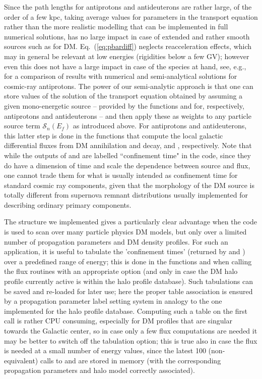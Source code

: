 Since the path lengths for antiprotons and antideuterons are rather large, of the order of a few kpc, taking average
values for parameters in the transport equation rather than the more realistic modelling that can be implemented
in full numerical solutions, has no large impact in case of extended and rather 
smooth sources such as for DM. 
Eq.~(\ref{eq:pbardiff}) neglects reacceleration effects, which may in general be relevant at low energies
(rigidities below a few GV); however even this does not have a large impact in case of the species at hand,
see, e.g.,~\cite{Evoli:2011id} for a comparison of results with numerical and semi-analytical solutions for cosmic-ray
antiprotons. The power of our semi-analytic approach is that one can store values of 
the solution of the transport equation obtained by assuming 
a given mono-energetic source -- provided by 
the functions  and  for, respectively, antiprotons and antideuterons -- and 
then apply these as weights to any particle source term $\mathcal{S}_n(E_f)$ as introduced above.
For antiprotons and antideuterons, this latter step is done in the functions that compute the local galactic differential 
fluxes from DM annihilation and decay,  and , respectively.
Note that while the outputs of  and   are labelled ``confinement time" in the code,
since they do have a dimension of time and scale the dependence between source and flux, one cannot trade
them for what is usually intended as confinement time for standard cosmic ray components, given that the
morphology of the DM source is totally different from supernova remnant distributions usually implemented
for describing ordinary primary components.

The structure we implemented gives a particularly clear advantage when the code is used to scan over many 
particle physics DM models, but only over a limited number of propagation parameters and DM density profiles.
For such an application,  it is useful to tabulate the 'confinement times' (returned by  and 
) over a predefined range of energy; this is
done in the functions  and  when calling the flux routines with an appropriate
option (and only in case the DM halo profile currently active is within the halo profile database). 
Such tabulations  can be saved and re-loaded for later use; 
here the proper table association is ensured by 
a propagation parameter label setting system in analogy to the one implemented for the halo profile database. 
Computing such a table on the first call is rather CPU  consuming, especially for DM profiles that are 
singular towards the Galactic center, so in case only a few flux
computations are needed it may be better to switch off the tabulation option; this is true also in case the flux is
needed at a small number of energy values, since the latest 100 (non-equivalent) calls to  
 and 
are stored in memory (with the corresponding propagation parameters and halo model correctly associated).

